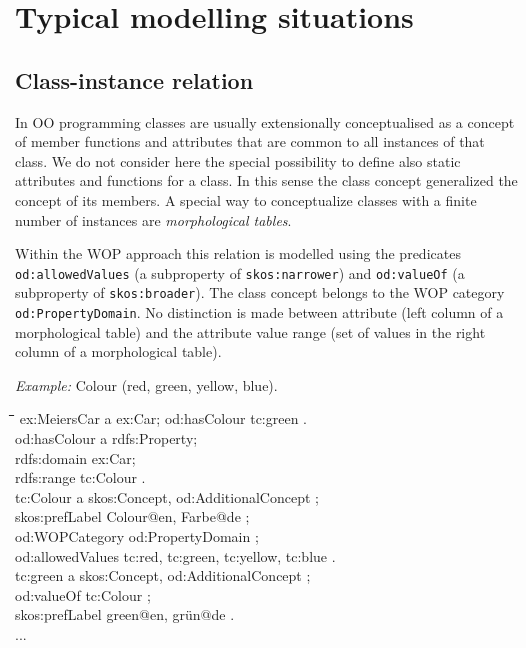 \documentclass[11pt,a4paper]{article}
\newenvironment{code}{\tt \begin{tabbing}
\hskip12pt\=\hskip12pt\=\hskip12pt\=\hskip12pt\=\hskip5cm\=\hskip5cm\=\kill}
{\end{tabbing}}
\def\dq{{\char34}}
\begin{document}
\section{Typical modelling situations}

\subsection{Class-instance relation}

In OO programming classes are usually extensionally conceptualised as a
concept of member functions and attributes that are common to all instances of
that class.  We do not consider here the special possibility to define also
static attributes and functions for a class.  In this sense the class concept
generalized the concept of its members.  A special way to conceptualize
classes with a finite number of instances are \emph{morphological tables}.

Within the WOP approach this relation is modelled using the predicates
\texttt{od:allowedValues} (a subproperty of \texttt{skos:narrower}) and
\texttt{od:valueOf} (a subproperty of \texttt{skos:broader}). The class
concept belongs to the WOP category \texttt{od:PropertyDomain}. No distinction
is made between attribute (left column of a morphological table) and the
attribute value range (set of values in the right column of a morphological
table).

\emph{Example:}  Colour (red, green, yellow, blue).

\begin{code}
  ex:MeiersCar a ex:Car; od:hasColour tc:green . \\[4pt]
    
  od:hasColour a rdfs:Property;\\
    \>rdfs:domain ex:Car;\\
    \>rdfs:range tc:Colour .\\[4pt]

  tc:Colour a skos:Concept, od:AdditionalConcept ;\\
  \>skos:prefLabel {\dq}Colour{\dq}@en, {\dq}Farbe{\dq}@de ;\\
  \>od:WOPCategory od:PropertyDomain ;\\
  \>od:allowedValues tc:red, tc:green, tc:yellow, tc:blue .\\[4pt]

  tc:green a skos:Concept, od:AdditionalConcept ;\\
  \>od:valueOf tc:Colour ; \\
  \>skos:prefLabel {\dq}green{\dq}@en, {\dq}grün{\dq}@de .\\[4pt]
  ...  
\end{code}
\end{document}
